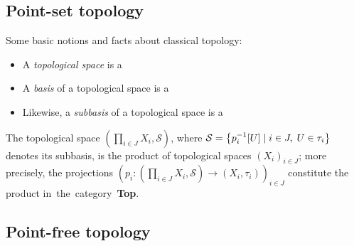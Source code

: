 \subsection*{Point-set topology}

Some basic notions and facts about classical topology:

\begin{itemize}
\item A \emph{topological space} is a
\item A \emph{basis} of a topological space is a
\item Likewise, a \emph{subbasis} of a topological space is a
\end{itemize}

\begin{fact}
  The topological space $\left( \prod_{i\in J} X_i, \mathcal{S} \right)$, where
  $\mathcal{S} = \left\{ p_{i}^{-1}[U] \mid i\in J, \; U\in \tau_i \right\}$
  denotes its subbasis, is the product of topological spaces $\left( X_i
  \right)_{i\in J}$;
  more precisely, the projections $\left( p_i\colon \left(\prod_{i\in J} X_i,
  \mathcal{S}\right) \to \left(X_i, \tau_i\right) \right)_{i\in J}$
  constitute the product in~the~category~{\bf Top}.
\end{fact}

\subsection*{Point-free topology}

